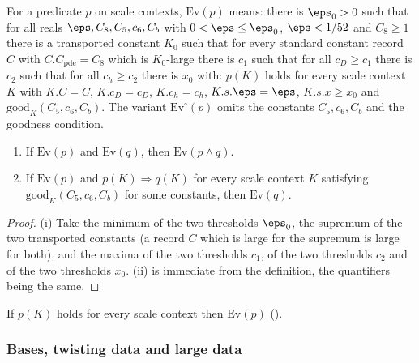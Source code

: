 \begin{definition}\label{pf:baselat1:def:evg}
For a predicate $p$ on scale contexts, $\mathrm{Ev}(p)$ means: there is $\eps_0>0$ such that for all
reals $\eps,C_8,C_5,c_6,C_b$ with $0<\eps\le\eps_0$, $\eps<1/52$ and $C_8\ge1$ there is a transported
constant $K_0$ such that for every standard constant record $C$ with $C.C_{\mathrm{pde}}=C_8$ which is
$K_0$-large there is $c_1$ such that for all $c_D\ge c_1$ there is $c_2$ such that for all $c_h\ge c_2$
there is $x_0$ with: $p(K)$ holds for every scale context $K$ with $K.C=C$, $K.c_D=c_D$, $K.c_h=c_h$,
$K.s.\eps=\eps$, $K.s.x\ge x_0$ and $\mathrm{good}_K(C_5,c_6,C_b)$. The variant $\mathrm{Ev}^{\circ}(p)$ omits the
constants $C_5,c_6,C_b$ and the goodness condition.
\end{definition}

\begin{lemma}\label{pf:baselat1:evg-inter}
\begin{enumerate}[label=(\roman*)]
\item If $\mathrm{Ev}(p)$ and $\mathrm{Ev}(q)$, then $\mathrm{Ev}(p\wedge q)$.
\item If $\mathrm{Ev}(p)$ and $p(K)\Rightarrow q(K)$ for every scale context $K$ satisfying
  $\mathrm{good}_K(C_5,c_6,C_b)$ for some constants, then $\mathrm{Ev}(q)$.
\end{enumerate}
\end{lemma}

\begin{proof}
(i) Take the minimum of the two thresholds $\eps_0$, the supremum of the two transported constants (a record
$C$ which is large for the supremum is large for both), and the maxima of the two thresholds $c_1$, of the two
thresholds $c_2$ and of the two thresholds $x_0$. (ii) is immediate from the definition, the quantifiers
being the same.
\end{proof}

If $p(K)$ holds for every scale context then $\mathrm{Ev}(p)$
().

\subsubsection{Bases, twisting data and large data}

